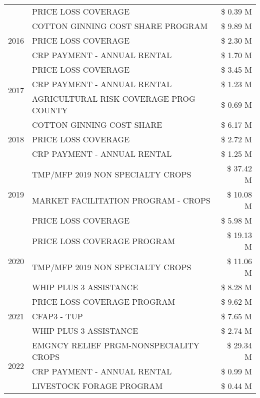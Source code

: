 \begin{tabular}{llr}
 & PRICE LOSS COVERAGE & \$ 0.39 M \\
\cline{1-3}
\multirow[t]{3}{*}{2016} & COTTON GINNING COST SHARE PROGRAM & \$ 9.89 M \\
 & PRICE LOSS COVERAGE & \$ 2.30 M \\
 & CRP PAYMENT - ANNUAL RENTAL & \$ 1.70 M \\
\cline{1-3}
\multirow[t]{3}{*}{2017} & PRICE LOSS COVERAGE & \$ 3.45 M \\
 & CRP PAYMENT - ANNUAL RENTAL & \$ 1.23 M \\
 & AGRICULTURAL RISK COVERAGE PROG - COUNTY & \$ 0.69 M \\
\cline{1-3}
\multirow[t]{3}{*}{2018} & COTTON GINNING COST SHARE & \$ 6.17 M \\
 & PRICE LOSS COVERAGE & \$ 2.72 M \\
 & CRP PAYMENT - ANNUAL RENTAL & \$ 1.25 M \\
\cline{1-3}
\multirow[t]{3}{*}{2019} & TMP/MFP 2019 NON SPECIALTY CROPS & \$ 37.42 M \\
 & MARKET FACILITATION PROGRAM - CROPS & \$ 10.08 M \\
 & PRICE LOSS COVERAGE & \$ 5.98 M \\
\cline{1-3}
\multirow[t]{3}{*}{2020} & PRICE LOSS COVERAGE PROGRAM & \$ 19.13 M \\
 & TMP/MFP 2019 NON SPECIALTY CROPS & \$ 11.06 M \\
 & WHIP PLUS 3 ASSISTANCE & \$ 8.28 M \\
\cline{1-3}
\multirow[t]{3}{*}{2021} & PRICE LOSS COVERAGE PROGRAM & \$ 9.62 M \\
 & CFAP3 - TUP & \$ 7.65 M \\
 & WHIP PLUS 3 ASSISTANCE & \$ 2.74 M \\
\cline{1-3}
\multirow[t]{3}{*}{2022} & EMGNCY RELIEF PRGM-NONSPECIALITY CROPS & \$ 29.34 M \\
 & CRP PAYMENT - ANNUAL RENTAL & \$ 0.99 M \\
 & LIVESTOCK FORAGE PROGRAM & \$ 0.44 M \\
\cline{1-3}
\bottomrule
\end{tabular}
